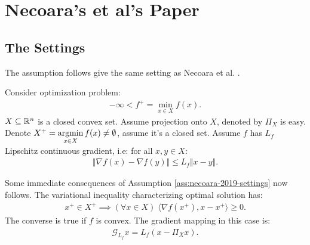 \documentclass[12pt]{report}
\begin{document}
    \section{Necoara's et al's Paper}
        \subsection{The Settings}
            The assumption follows give the same setting as Necoara et al. \cite{necoara_linear_2019}. 
            \begin{assumption}\label{ass:necoara-2019-settings}
                Consider optimization problem: 
                \begin{align}
                    -\infty < f^+ = \min_{x \in X} f(x) . 
                \end{align}\label{problem:necoara-2019}
                $X\subseteq \mathbb R^n$ is a closed convex set. 
                Assume projection onto $X$, denoted by $\Pi_X$ is easy. 
                Denote $X^+ = \mathop{\rm argmin}\limits_{x \in X}f(x) \neq \emptyset$, assume it's a closed set. 
                Assume $f$ has $L_f$ Lipschitz continuous gradient, i.e: for all $x, y\in X$: 
                \begin{align*}
                    \Vert \nabla f(x) - \nabla f(y)\Vert \le L_f\Vert x - y\Vert. 
                \end{align*}
            \end{assumption}
            Some immediate consequences of Assumption \ref{ass:necoara-2019-settings} now follows. 
            The variational inequality characterizing optimal solution has: 
            \begin{align}\label{ineq:pg-opt-cond}
                x^+ \in X^+ \implies 
                (\forall x \in X)\; \langle \nabla f(x^+), x - x^+\rangle \ge 0. 
            \end{align}
            The converse is true if $f$ is convex. 
            The gradient mapping in this case is: 
            \begin{align*}
                \mathcal G_{L_f}x = L_f(x - \Pi_{X}x). 
            \end{align*}
\end{document}

